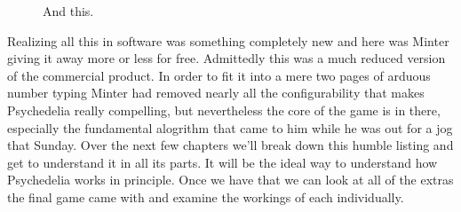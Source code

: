 \begin{figure}[H]
    \centering
    \begin{adjustbox}{width=13cm,center}
    \end{adjustbox}
\caption{And this.}
\end{figure}

Realizing all this in software was something completely new and here was Minter giving it away more or less for free. Admittedly this was
a much reduced version of the commercial product. In order to fit it into a mere two pages of arduous number typing Minter had removed
nearly all the configurability that makes Psychedelia really compelling, but nevertheless the core of the game is in there, especially
the fundamental alogrithm that came to him while he was out for a jog that Sunday. Over the next few chapters we'll break down this
humble listing and get to understand it in all its parts. It will be the ideal way to understand how Psychedelia works in principle.
Once we have that we can look at all of the extras the final game came with and examine the workings of each individually.

